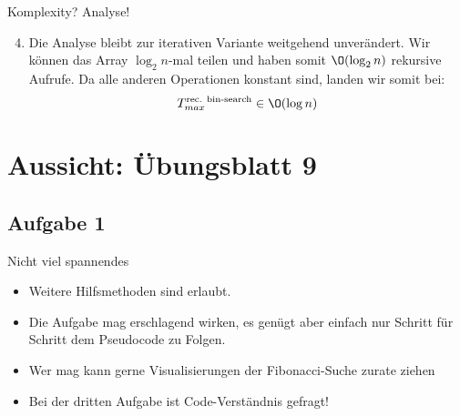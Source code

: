{\begin{frame}[c]{Komplexity? Analyse!}
\begin{enumerate}[<+(1)->]
    \setcounter{enumi}{3}
    \item {} \pause
    Die Analyse bleibt zur iterativen Variante weitgehend unverändert. \pause Wir können das Array \(\log_2 n\)-mal teilen und haben somit \(\O(\log_2 n)\) rekursive Aufrufe. Da alle anderen Operationen konstant sind, landen wir somit bei: \begin{equation*}
        T_{max}^{\text{rec. bin-search}} \in \O(\log n)
    \end{equation*}
\end{enumerate}
\end{frame}
}

\iffull
{}
\section{Aussicht: Übungsblatt 9}
\subsection{Aufgabe 1}
\begin{frame}{Nicht viel spannendes}
    \begin{itemize}[<+(1)->]
        \itemsep5pt
        \item Weitere Hilfsmethoden sind erlaubt.
        \item Die Aufgabe mag erschlagend wirken, es genügt aber einfach nur Schritt für Schritt dem Pseudocode zu Folgen.
        \item Wer mag kann gerne Visualisierungen der Fibonacci-Suche zurate ziehen 
        \item Bei der dritten Aufgabe ist Code-Verständnis gefragt!
    \end{itemize}
\end{frame}

\fi

